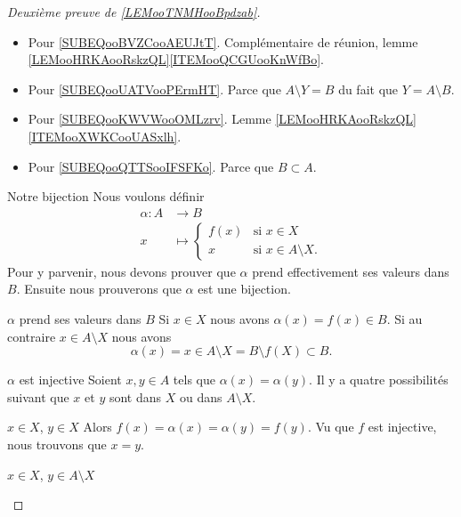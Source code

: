\begin{proof}[Deuxième preuve de \ref{LEMooTNMHooBpdzab}\cite{BIBooZFPUooIiywbk}]
\begin{subproof}
\begin{itemize}
                \item Pour \eqref{SUBEQooBVZCooAEUJtT}. Complémentaire de réunion, lemme \ref{LEMooHRKAooRskzQL}\ref{ITEMooQCGUooKnWfBo}.
                \item Pour \eqref{SUBEQooUATVooPErmHT}. Parce que \( A\setminus Y=B\) du fait que \( Y=A\setminus B\).
                \item Pour \eqref{SUBEQooKWVWooOMLzrv}. Lemme \ref{LEMooHRKAooRskzQL}\ref{ITEMooXWKCooUASxlh}.
                \item Pour \eqref{SUBEQooQTTSooIFSFKo}. Parce que \( B\subset A\).
            \end{itemize}
        \item[Notre bijection]
            Nous voulons définir
            \begin{equation}
                \begin{aligned}
                    \alpha\colon A&\to B \\
                    x&\mapsto \begin{cases}
                        f(x)    &   \text{si } x\in X\\
                        x    &    \text{si } x\in A\setminus X.
                    \end{cases}
                \end{aligned}
            \end{equation}
            Pour y parvenir, nous devons prouver que \( \alpha\) prend effectivement ses valeurs dans \( B\). Ensuite nous prouverons que \( \alpha\) est une bijection.
        \item[\( \alpha\) prend ses valeurs dans \( B\)]
            Si \( x\in X\) nous avons \( \alpha(x)=f(x)\in B\). Si au contraire \( x\in A\setminus X\) nous avons
            \begin{equation}
                \alpha(x)=x\in A\setminus X=B\setminus f(X)\subset B.
            \end{equation}
        \item[\( \alpha\) est injective]
            Soient \( x,y\in A\) tels que \( \alpha(x)=\alpha(y)\). Il y a quatre possibilités suivant que \( x\) et \( y\) sont dans \( X\) ou dans \( A\setminus X\).
            \begin{subproof}
            \item[\( x\in X\), \( y\in X\)]
                Alors \( f(x)=\alpha(x)=\alpha(y)=f(y)\). Vu que \( f\) est injective, nous trouvons que \( x=y\).
            \item[\( x\in X\), \( y\in A\setminus X\)]

\end{subproof}
\end{subproof}
\end{proof}

